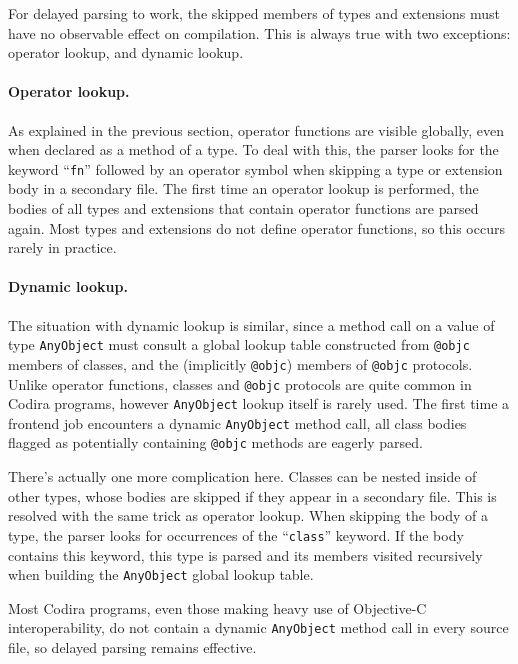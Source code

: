 \documentclass[../generics]{subfiles}
\begin{document}
For delayed parsing to work, the skipped members of types and extensions must have no observable effect on compilation. This is always true with two exceptions: operator lookup, and dynamic lookup.

\paragraph{Operator lookup.}
As explained in the previous section, operator functions are visible globally, even when declared as a method of a type. To deal with this, the parser looks for the keyword ``\texttt{fn}'' followed by an operator symbol when skipping a type or extension body in a secondary file. The first time an operator lookup is performed, the bodies of all types and extensions that contain operator functions are parsed again. Most types and extensions do not define operator functions, so this occurs rarely in practice.

\paragraph{Dynamic  lookup.}
The situation with dynamic lookup is similar, since a method call on a value of type \texttt{AnyObject} must consult a global lookup table constructed from \texttt{@objc} members of classes, and the (implicitly \texttt{@objc}) members of \texttt{@objc} protocols.  Unlike operator functions, classes and \texttt{@objc} protocols are quite common in Codira programs, however \texttt{AnyObject} lookup itself is rarely used. The first time a frontend job encounters a dynamic \texttt{AnyObject} method call, all class bodies flagged as potentially containing \texttt{@objc} methods are eagerly parsed.

There's actually one more complication here. Classes can be nested inside of other types, whose bodies are skipped if they appear in a secondary file. This is resolved with the same trick as operator lookup. When skipping the body of a type, the parser looks for occurrences of the ``\texttt{class}'' keyword. If the body contains this keyword, this type is parsed and its members visited recursively when building the \texttt{AnyObject} global lookup table.

Most Codira programs, even those making heavy use of Objective-C interoperability, do not contain a dynamic \texttt{AnyObject} method call in every source file, so delayed parsing remains effective.
\end{document}
